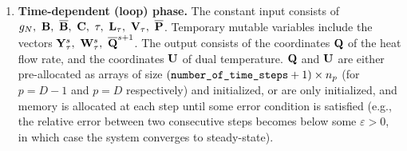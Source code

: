 \begin{algorithm}
\begin{enumerate}
\begin{itemize}
      \end{itemize}
    \item
      \textbf{Time-dependent (loop) phase.}
      The constant input consists of
      $g_N,\ {\bf B},\ \overline{\bf B},\ {\bf C},\ \tau,\
      {\bf L}_\tau,\ {\bf V}_\tau,\ \overline{\bf P}$.
      Temporary mutable variables include the vectors
      ${\bf Y}_\tau^s,\ {\bf W}_\tau^s,\ \overline{\bf Q}^{s + 1}$.
      The output consists of the coordinates ${\bf Q}$ of the heat flow rate,
      and the coordinates ${\bf U}$ of dual temperature.
      ${\bf Q}$ and ${\bf U}$ are either pre-allocated as arrays of size
      $(\verb|number_of_time_steps| + 1) \times n_p$
      (for $p = D - 1$ and $p = D$ respectively) and initialized,
      or are only initialized, and memory is allocated at each step until some
      error condition is satisfied
      (e.g., the relative error between two consecutive steps becomes below some
      $\varepsilon > 0$, in which case the system converges to steady-state).


\end{enumerate}
\end{algorithm}
